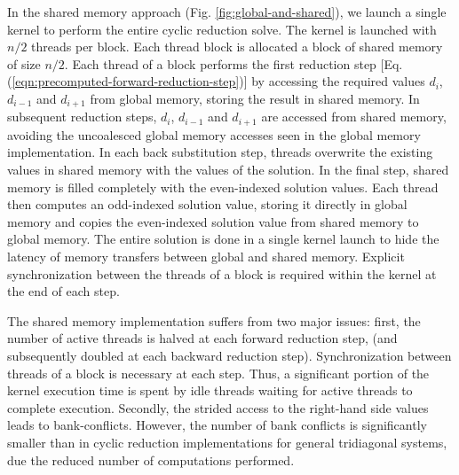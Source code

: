 In the shared memory approach (Fig. \ref{fig:global-and-shared}),
we launch a single kernel to perform the entire
cyclic reduction solve.
The kernel is launched with $n/2$ threads per block.
Each thread block is allocated a block of shared memory of size $n/2$.
Each thread of a block performs the first reduction step
[Eq. (\ref{eqn:precomputed-forward-reduction-step})]
by accessing the required values
$d_i$, $d_{i-1}$ and $d_{i+1}$ from global memory,
storing the result in shared memory.
In subsequent reduction steps,
$d_i$, $d_{i-1}$ and $d_{i+1}$
are accessed from shared memory,
avoiding the uncoalesced global memory accesses
seen in the global memory implementation.
In each back substitution step,
threads overwrite the existing values in shared memory
with the values of the solution.
In the final step,
shared memory is filled completely
with the even-indexed solution values.
Each thread then computes an odd-indexed solution value,
storing it directly in global memory
and copies the even-indexed solution value
from shared memory to global memory.
The entire solution is done in a single kernel launch
to hide the latency of
memory transfers between global and shared memory.
Explicit synchronization between the threads of a block
is required within the kernel at the end of each step.

The shared memory implementation suffers from two major issues:
first, the number of active threads is halved at each forward reduction step,
(and subsequently doubled at each backward reduction step).
Synchronization between threads of a block is necessary at each step.
Thus, a significant portion of the kernel execution time is
spent by idle threads waiting for active threads to complete execution.
Secondly, the strided access to the
right-hand side values leads to bank-conflicts.
However, the number of bank conflicts is significantly smaller
than in cyclic reduction implementations for general tridiagonal systems,
due the reduced number of computations performed.
